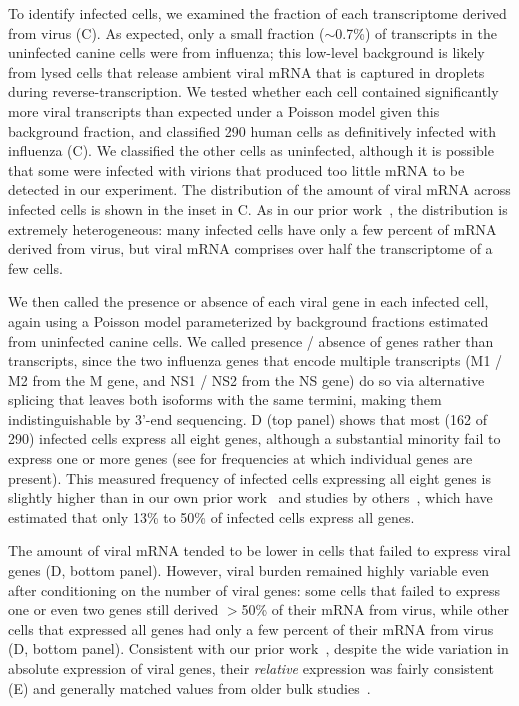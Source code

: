 \documentclass[9pt,lineno]{template}
\begin{document}
To identify infected cells, we examined the fraction of each transcriptome derived from virus (C).
As expected, only a small fraction ($\sim$0.7\%) of transcripts in the uninfected canine cells were from influenza; this low-level background is likely from lysed cells that release ambient viral mRNA that is captured in droplets during reverse-transcription.
We tested whether each cell contained significantly more viral transcripts than expected under a Poisson model given this background fraction, and classified 290 human cells as definitively infected with influenza (C).
We classified the other cells as uninfected, although it is possible that some were infected with virions that produced too little mRNA to be detected in our experiment.
The distribution of the amount of viral mRNA across infected cells is shown in the inset in C.
As in our prior work~\citep{russell2018extreme}, the distribution is extremely heterogeneous: many infected cells have only a few percent of mRNA derived from virus, but viral mRNA comprises over half the transcriptome of a few cells.

We then called the presence or absence of each viral gene in each infected cell, again using a Poisson model parameterized by background fractions estimated from uninfected canine cells.
We called presence / absence of genes rather than transcripts, since the two influenza genes that encode multiple transcripts (M1 / M2 from the M gene, and NS1 / NS2 from the NS gene) do so via alternative splicing that leaves both isoforms with the same termini, making them indistinguishable by 3'-end sequencing.
D (top panel) shows that most (162 of 290) infected cells express all eight genes, although a substantial minority fail to express one or more genes (see  for frequencies at which individual genes are present).
This measured frequency of infected cells expressing all eight genes is slightly higher than in our own prior work~\citep{russell2018extreme} and studies by others~\citep{brooke2013most, heldt2015single, dou2017analysis}, which have estimated that only 13\% to 50\% of infected cells express all genes. 

The amount of viral mRNA tended to be lower in cells that failed to express viral genes (D, bottom panel).
However, viral burden remained highly variable even after conditioning on the number of viral genes: some cells that failed to express one or even two genes still derived $>$50\% of their mRNA from virus, while other cells that expressed all genes had only a few percent of their mRNA from virus (D, bottom panel).
Consistent with our prior work~\citep{russell2018extreme}, despite the wide variation in absolute expression of viral genes, their \emph{relative} expression was fairly consistent (E) and generally matched values from older bulk studies~\citep{hatada1989control}.
\end{document}
